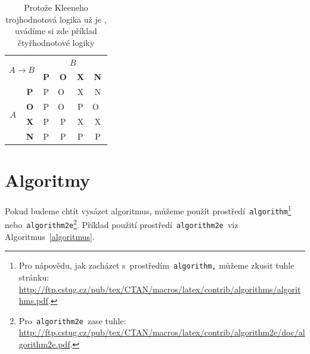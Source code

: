 \documentclass[a4paper, 11pt]{article}
\begin{document}
\begin{table}[ht]
            \begin{tabular}{|c|c|c|c|c|c|}
                \hline
                \multicolumn{2}{|c|}{\multirow{2}{*}{$A\rightarrow B$}} & \multicolumn{4}{c|}{$B$} \\
                \cline{3-6}
                \multicolumn{2}{|c|}{} & \textbf{P} & \textbf{O} & \textbf{X} & \textbf{N} \\
                \hline
                \multirow{4}{*}{$A$} & \textbf{P} & P & O~& X & N \\
                \cline{2-6} & \textbf{O} & P & O~& P & O~\\
                \cline{2-6} & \textbf{X} & P & P & X & X \\
                \cline{2-6} & \textbf{N} & P & P & P & P \\
                \hline
            \end{tabular}
            \caption{Protože Kleeneho trojhodnotová logika už je , uvádíme si zde příklad čtyřhodnotové logiky}
            \label{tabulka2}
        \end{table}

        \bigskip

\section{Algoritmy} \label{algoritmy}
    Pokud budeme chtít vysázet algoritmus, můžeme použít prostředí\texttt{ algorithm}\footnote{Pro nápovědu, jak zacházet s~prostředím\texttt{ algorithm,} můžeme zkusit tuhle stránku:\\ \href{http://ftp.cstug.cz/pub/tex/CTAN/macros/latex/contrib/algorithms/algorithms.pdf}{http://ftp.cstug.cz/pub/tex/CTAN/macros/latex/contrib/algorithms/algorithms.pdf}.}\texttt{ } nebo\texttt{ algorithm2e}\footnote{Pro\texttt{ algorithm2e }zase tuhle: \href{http://ftp.cstug.cz/pub/tex/CTAN/macros/latex/contrib/algorithm2e/doc/algorithm2e.pdf}{http://ftp.cstug.cz/pub/tex/CTAN/macros/latex/contrib/algorithm2e/doc/algorithm2e.pdf}.}.
    Příklad použití prostředí\texttt{ algorithm2e }viz Algoritmus~\ref{algoritmus}.

    \bigskip
\end{document}
